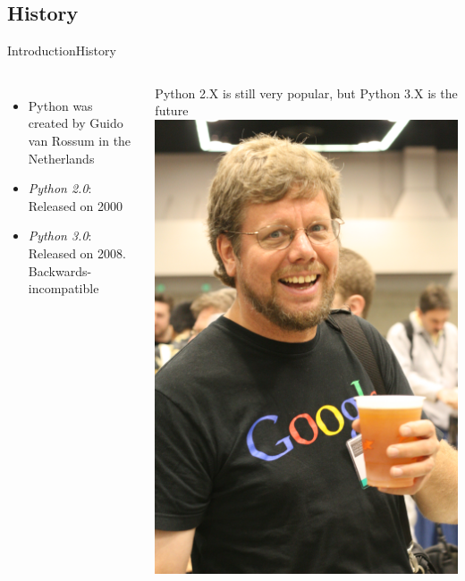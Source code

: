 \documentclass[10pt,compress]{beamer} %
\begin{document}
\subsection{History}
\begin{frame}{Introduction}{History}
    \begin{columns}
			\begin{itemize}
				\item Python was created by Guido van Rossum in the Netherlands
				\item \textit{Python 2.0}: Released on 2000
				\item \textit{Python 3.0}: Released on 2008. Backwards-incompatible
			\end{itemize}
			\bigskip
		\centering Python 2.X is still very popular, but Python 3.X is the future
		\centering \includegraphics[width=\linewidth]{figs/guido.jpg}
	\end{columns}
\end{frame}
\end{document}
